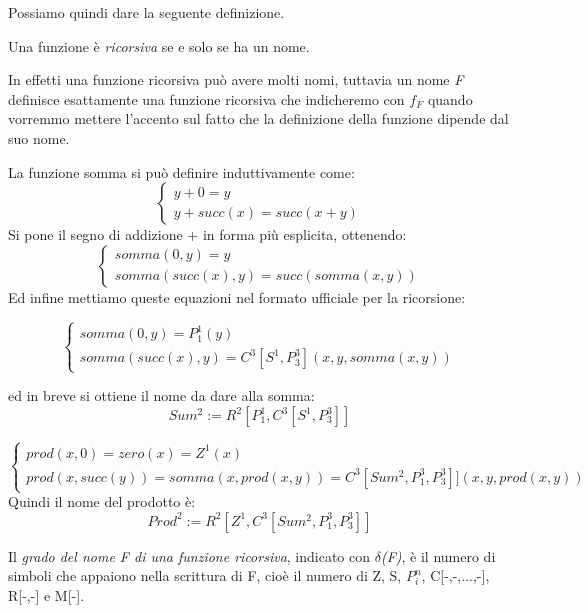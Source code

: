 Possiamo quindi dare la seguente definizione.

\begin{defi}
Una funzione è \emph{ricorsiva} se e solo se ha un nome.
\end{defi}
 
In effetti una funzione ricorsiva può avere molti nomi, tuttavia un nome \emph{F} definisce esattamente una funzione ricorsiva che indicheremo con \emph{$f_F$} quando vorremmo mettere l'accento sul fatto che la definizione della funzione dipende dal suo nome.
\begin{esempio}
[somma]
La funzione somma si può definire induttivamente come:
$$\left\{
\begin{array}{ll} y + 0 = y\\
                 y + succ(x)= succ(x + y)
\end{array} \right.$$
Si pone il segno di addizione + in forma più esplicita, ottenendo:
$$\left\{
\begin{array}{ll} somma(0, y) = y\\
                 somma(succ(x), y) = succ(somma(x, y))
\end{array} \right.$$
Ed infine mettiamo queste equazioni nel formato ufficiale per la ricorsione:

$$\left\{
\begin{array}{ll} somma(0, y) = P^1_1(y)\\
                 somma(succ(x), y) = C^3[S^1, P^3_3](x, y, somma(x, y))
\end{array} \right.$$

ed in breve si ottiene il nome da dare alla somma:
$$Sum^2 := R^2[P^1_1, C^3[S^1, P^3_3]]$$	
\end{esempio}

\begin{esempio}
[prodotto]

$$\left\{
\begin{array}{ll} prod(x, 0) = zero(x) = Z^1(x)\\
                 prod(x, succ(y)) = somma(x, prod(x, y)) = C^3[Sum^2, P^3_1, P^3_3]](x, y, prod(x, y))
\end{array} \right.$$
Quindi il nome del prodotto è: 
$$Prod^2 := R^2[Z^1, C^3[Sum^2, P^3_1, P^3_3]]$$	
\end{esempio}




\begin{defi}
Il \emph{grado del nome F di una funzione ricorsiva}, indicato con \emph{$\delta$(F)}, è il numero di simboli che appaiono nella scrittura di F, cioè il numero di Z, S, $P^n_i$, C[-,-,...,-], R[-,-] e M[-].
\end{defi}

